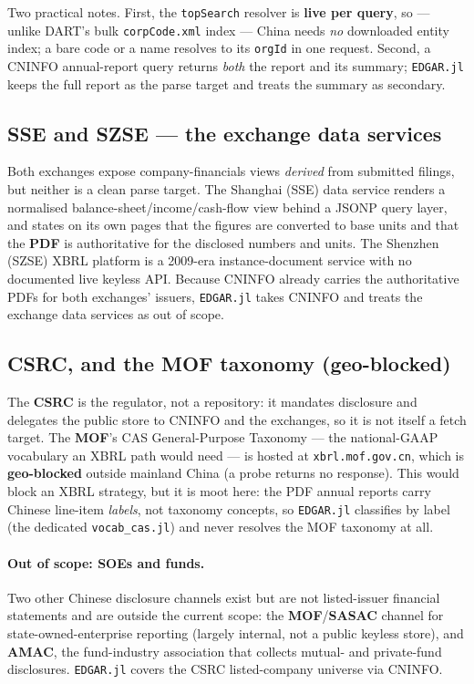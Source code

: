 \documentclass[11pt,a4paper]{report}
\begin{document}
\noindent Two practical notes. First, the \texttt{topSearch} resolver is \textbf{live per query}, so ---
unlike DART's bulk \texttt{corpCode.xml} index --- China needs \emph{no} downloaded entity index; a bare
code or a name resolves to its \texttt{orgId} in one request. Second, a CNINFO annual-report query returns
\emph{both} the report and its summary; \texttt{EDGAR.jl} keeps the full report as the parse target and
treats the summary as secondary.

\subsection{SSE and SZSE --- the exchange data services}
Both exchanges expose company-financials views \emph{derived} from submitted filings, but neither is a clean
parse target. The Shanghai (SSE) data service renders a normalised balance-sheet/income/cash-flow view
behind a JSONP query layer, and states on its own pages that the figures are converted to base units and
that the \textbf{PDF} is authoritative for the disclosed numbers and units. The Shenzhen (SZSE) XBRL platform
is a 2009-era instance-document service with no documented live keyless API. Because CNINFO already carries
the authoritative PDFs for both exchanges' issuers, \texttt{EDGAR.jl} takes CNINFO and treats the exchange
data services as out of scope.

\subsection{CSRC, and the MOF taxonomy (geo-blocked)}
The \textbf{CSRC} is the regulator, not a repository: it mandates disclosure and delegates the public store
to CNINFO and the exchanges, so it is not itself a fetch target. The \textbf{MOF}'s CAS General-Purpose
Taxonomy --- the national-GAAP vocabulary an XBRL path would need --- is hosted at \texttt{xbrl.mof.gov.cn},
which is \textbf{geo-blocked} outside mainland China (a probe returns no response). This would block an XBRL
strategy, but it is moot here: the PDF annual reports carry Chinese line-item \emph{labels}, not taxonomy
concepts, so \texttt{EDGAR.jl} classifies by label (the dedicated \texttt{vocab\_cas.jl}) and never resolves
the MOF taxonomy at all.

\paragraph{Out of scope: SOEs and funds.} Two other Chinese disclosure channels exist but are not listed-issuer
financial statements and are outside the current scope: the \textbf{MOF}/\textbf{SASAC} channel for
state-owned-enterprise reporting (largely internal, not a public keyless store), and \textbf{AMAC}, the
fund-industry association that collects mutual- and private-fund disclosures. \texttt{EDGAR.jl} covers the CSRC listed-company universe via CNINFO.
\end{document}

